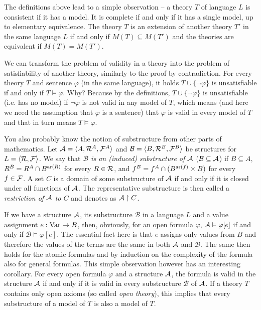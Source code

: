 The definitions above lead to a simple observation -- a theory $T$ of language $L$ is consistent if it has a model. It is complete if and only if it has a single model, up to elementary equivalence. The theory $T$ is an extension of another theory $T'$ in the same language $L$ if and only if $M(T) \subseteq M(T')$ and the theories are equivalent if $M(T) = M(T')$.

We can transform the problem of validity in a theory into the problem of satisfiability of another theory, similarly to the proof by contradiction. For every theory $T$ and sentence $\varphi$ (in the same language), it holds $T \cup \{\neg \varphi\}$ is unsatisfiable if and only if $T \vDash \varphi$. Why? Because by the definitions, $T \cup \{\neg \varphi\}$ is unsatisfiable (i.e. has no model) if $\neg \varphi$ is not valid in any model of $T$, which means (and here we need the assumption that $\varphi$ is a sentence) that $\varphi$ is valid in every model of $T$ and that in turn means $T \vDash \varphi$. 

You also probably know the notion of substructure from other parts of mathematics. Let $\mathcal{A} = \langle A, \mathcal{R}^A, \mathcal{F}^A \rangle$ and $\mathcal{B} = \langle B, \mathcal{R}^B, \mathcal{F}^B \rangle$ be structures for $L = \langle \mathcal{R}, \mathcal{F} \rangle$. We say that \emph{$\mathcal{B}$ is an (induced) substructure of $\mathcal{A}$} ($\mathcal{B} \subseteq \mathcal{A}$) if $B \subseteq A$, $R^B = R^A \cap B^{\operatorname{ar}(R)}$ for every $R \in \mathcal{R}$, and $f^B = f^A \cap (B^{\operatorname{ar}(f)}\times B)$ for every $f \in \mathcal{F}$. A set $C$ is a domain of some substructure of $\mathcal{A}$ if and only if it is closed under all functions of $\mathcal{A}$. The representative substructure is then called a \emph{restriction of $\mathcal{A}$ to $C$} and denotes as $\mathcal{A} \upharpoonright C$.

If we have a structure $\mathcal{A}$, its substructure $\mathcal{B}$ in a language $L$ and a value assignment $e: \operatorname{Var} \to B$, then, obviously, for an open formula $\varphi$, $\mathcal{A} \vDash \varphi[e]$ if and only if $\mathcal{B} \vDash \varphi[e]$. The essential fact here is that $e$ assigns only values from $B$ and therefore the values of the terms are the same in both $\mathcal{A}$ and $\mathcal{B}$. The same then holds for the atomic formulas and by induction on the complexity of the formula also for general formulas. This simple observation however has an interesting corollary. For every open formula $\varphi$ and a structure $\mathcal{A}$, the formula is valid in the structure $\mathcal{A}$ if and only if it is valid in every substructure $\mathcal{B}$ of $\mathcal{A}$. If a theory $T$ contains only open axioms (so called \emph{open theory}), this implies that every substructure of a model of $T$ is also a model of $T$.

